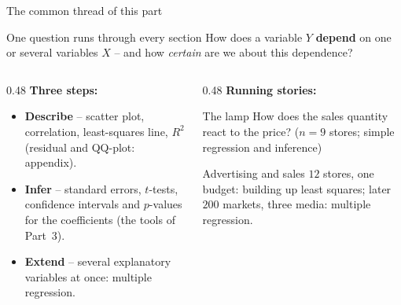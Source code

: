 \documentclass[aspectratio=169,11pt]{beamer}
\begin{document}
\begin{frame}{The common thread of this part}
  \begin{block}{One question runs through every section}
    How does a variable $Y$ \textbf{depend} on one or several variables $X$
    -- and how \emph{certain} are we about this dependence?
  \end{block}
  \begin{columns}[T]
    \begin{column}{0.48\textwidth}
      \small
      \textbf{Three steps:}
      \begin{itemize}\setlength{\itemsep}{2pt}
        \item \textcolor{hsbiblau}{\textbf{Describe}} -- scatter plot,
              correlation, least-squares line, $R^2$ (residual and QQ-plot: appendix).
        \item \textcolor{hsbiblau}{\textbf{Infer}} -- standard errors,
              $t$-tests, confidence intervals and $p$-values for the
              coefficients (the tools of Part~3).
        \item \textcolor{hsbiblau}{\textbf{Extend}} -- several
              explanatory variables at once: multiple regression.
      \end{itemize}
    \end{column}
    \begin{column}{0.48\textwidth}
      \small
      \textbf{Running stories:}
      \begin{block}{The lamp}
        How does the sales quantity react to the price? ($n=9$ stores;
        simple regression and inference)
      \end{block}
      \begin{block}{Advertising and sales}
        $12$ stores, one budget: building up least squares; later
        $200$ markets, three media: multiple regression.
      \end{block}
    \end{column}
  \end{columns}
\end{frame}
\end{document}
